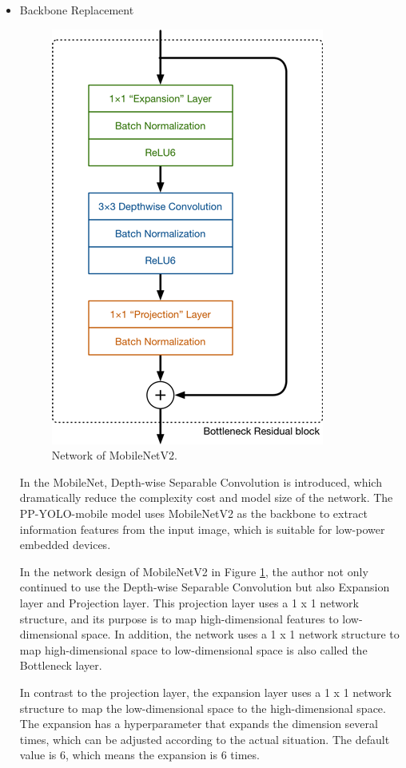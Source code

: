 \documentclass[sensors,article,submit,moreauthors,pdftex]{Definitions/mdpi}
\begin{document}
\begin{itemize}
\item{Backbone Replacement}

\begin{figure}[htbp]
\centering
\includegraphics[width=0.45\columnwidth]{images/MobileNetV2-structure.png}
\caption{Network of MobileNetV2.}
\label{fig:Microstructure}
\end{figure}

In the MobileNet, Depth-wise Separable Convolution is introduced, which dramatically reduce the complexity cost and model size of the network. The PP-YOLO-mobile model uses MobileNetV2 as the backbone to extract information features from the input image, which is suitable for low-power embedded devices.



In the network design of MobileNetV2 in Figure \ref{fig:Microstructure}, the author not only continued to use the Depth-wise Separable Convolution but also Expansion layer and Projection layer. This projection layer uses a 1 x 1 network structure, and its purpose is to map high-dimensional features to low-dimensional space. In addition, the network uses a 1 x 1 network structure to map high-dimensional space to low-dimensional space is also called the Bottleneck layer.

In contrast to the projection layer, the expansion layer uses a 1 x 1 network structure to map the low-dimensional space to the high-dimensional space. The expansion has a hyperparameter that expands the dimension several times, which can be adjusted according to the actual situation. The default value is 6, which means the expansion is 6 times.



\end{itemize}
\end{document}
